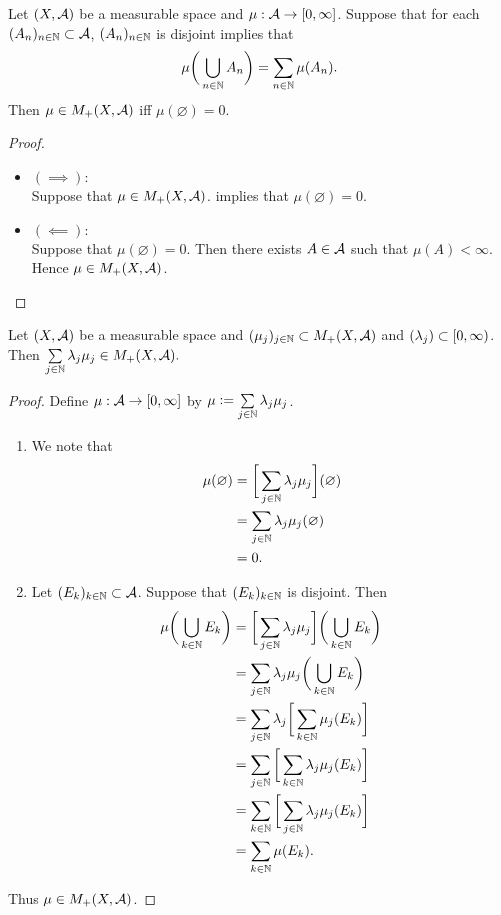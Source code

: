 \documentclass{book}
\begin{document}
	\begin{ex} 
		Let $(X,\mathcal{A})$ be a measurable space and $\mu: \mathcal{A} \rightarrow [0,\infty]$. Suppose that for each $(A_n)_{n \in \mathbb{N}} \subset \mathcal{A}$, $(A_n)_{n \in \mathbb{N}}$ is disjoint implies that 
		$$\mu\bigg(\bigcup_{n \in \mathbb{N}}A_n \bigg) = \sum_{n \in \mathbb{N}}\mu(A_n).$$
		Then $\mu \in M_+(X, \mathcal{A})$ iff $\mu(\varnothing) = 0$.
	\end{ex}

	\begin{proof}\
		\begin{itemize}
			\item $(\implies):$ \\
			Suppose that $\mu \in M_+(X, \mathcal{A})$.  implies that $\mu(\varnothing) = 0$.
			\item $(\impliedby):$ \\
			Suppose that $\mu(\varnothing) = 0$. Then there exists $A \in \mathcal{A}$ such that $\mu(A) < \infty$. Hence $\mu \in M_+(X, \mathcal{A})$.
		\end{itemize}
	\end{proof}
	
	\begin{ex} 
		Let $(X,\mathcal{A})$ be a measurable space and $(\mu_j)_{j \in \mathbb{N}} \subset M_+(X, \mathcal{A})$ and $(\lambda_j) \subset [0,\infty)$. Then $\sum\limits_{j \in \mathbb{N}} \lambda_j \mu_j \in M_+(X, \mathcal{A}).$ 
	\end{ex}

	\begin{proof} Define $\mu: \mathcal{A} \rightarrow [0,\infty]$ by $\mu \vcentcolon= \sum\limits_{j \in \mathbb{N}} \lambda_j \mu_j$.
		\begin{enumerate}
			\item We note that
			\begin{align*}
				\mu(\varnothing)
				& = \bigg[ \sum\limits_{j \in \mathbb{N}} \lambda_j \mu_j\bigg](\varnothing) \\
				& = \sum\limits_{j \in \mathbb{N}} \lambda_j \mu_j(\varnothing) \\
				& = 0.
			\end{align*}
			\item Let $(E_k)_{k \in \mathbb{N}} \subset \mathcal{A}$. Suppose that $(E_k)_{k \in \mathbb{N}}$ is disjoint. Then 
			\begin{align*}
				\mu \bigg( \bigcup_{k \in \mathbb{N}} E_k \bigg)
				& = \bigg[ \sum\limits_{j \in \mathbb{N}} \lambda_j \mu_j\bigg]\bigg( \bigcup_{k \in \mathbb{N}} E_k \bigg) \\
				& = \sum\limits_{j \in \mathbb{N}} \lambda_j \mu_j \bigg( \bigcup_{k \in \mathbb{N}} E_k \bigg) \\
				& = \sum\limits_{j \in \mathbb{N}} \lambda_j \bigg[ \sum_{k \in \mathbb{N}} \mu_j(E_k) \bigg] \\
				& = \sum\limits_{j \in \mathbb{N}} \bigg[ \sum_{k \in \mathbb{N}} \lambda_j \mu_j(E_k) \bigg] \\
				& = \sum\limits_{k \in \mathbb{N}} \bigg[ \sum\limits_{j \in \mathbb{N}} \lambda_j \mu_j(E_k) \bigg] \\
				& = \sum\limits_{k \in \mathbb{N}} \mu(E_k).
			\end{align*}
		\end{enumerate}
	Thus $\mu \in M_+(X, \mathcal{A})$.
	\end{proof}
	
\end{document}
